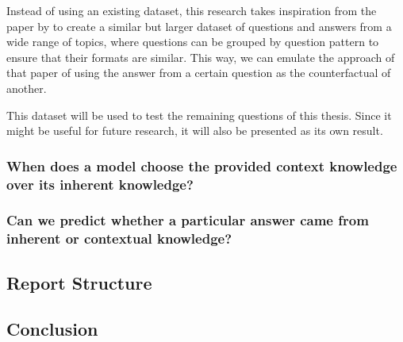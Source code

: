 Instead of using an existing dataset, this research takes inspiration from the paper by \citeauthor{factual_recall} to create a similar but larger dataset of questions and answers from a wide range of topics, where questions can be grouped by question pattern to ensure that their formats are similar.
This way, we can emulate the approach of that paper of using the answer from a certain question as the counterfactual of another.

This dataset will be used to test the remaining questions of this thesis.
Since it might be useful for future research, it will also be presented as its own result.


\subsubsection{When does a model choose the provided context knowledge over its inherent knowledge?}

\subsubsection{Can we predict whether a particular answer came from inherent or contextual knowledge?}

\subsection{Report Structure}

\subsection{Conclusion}
